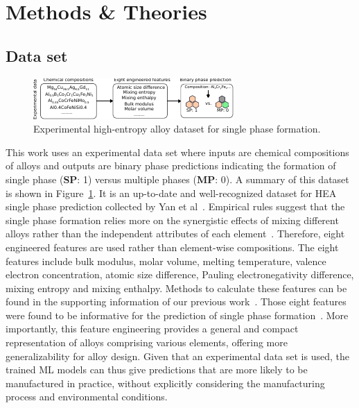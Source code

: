 \documentclass[a4paper]{article}
\begin{document}
\section{Methods \& Theories}
\subsection{Data set}

\begin{figure}
\centering
\includegraphics[width=5.in]{figures/dataset.pdf}
\caption{Experimental high-entropy alloy dataset for single phase formation.
\label{fig:dataset}}
\end{figure}

This work uses an experimental data set where inputs are chemical compositions of alloys and outputs are binary phase predictions indicating the formation of single phase (\textbf{SP}: 1) versus multiple phases (\textbf{MP}: 0).
A summary of this dataset is shown in Figure~\ref{fig:dataset}.
It is an up-to-date and well-recognized dataset for HEA single phase prediction collected by Yan et al~\cite{yan2021}.
Empirical rules suggest that the single phase formation relies more on the synergistic effects of mixing different alloys rather than the independent attributes of each element~\cite{yan2021, pei2020}.
Therefore, eight engineered features are used rather than element-wise compositions.
The eight features include bulk modulus, molar volume, melting temperature, valence electron concentration, atomic size difference, Pauling electronegativity difference, mixing entropy and mixing enthalpy.
Methods to calculate these features can be found in the supporting information of our previous work~\cite{zeng2024}.
Those eight features were found to be informative for the prediction of single phase formation~\cite{zeng2024, yan2021}.
More importantly, this feature engineering provides a general and compact representation of alloys comprising various elements, offering more generalizability for alloy design.
Given that an experimental data set is used, the trained ML models can thus give predictions that are more likely to be manufactured in practice, without explicitly considering the manufacturing process and environmental conditions.
\end{document}
